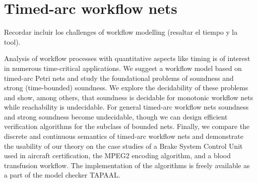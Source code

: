 \chapter{Timed-arc workflow nets}\label{chapter:c5}

Recordar incluir los challenges of workflow modelling (resaltar el tiempo y la tool).

Analysis of workflow processes with quantitative aspects
like timing is of interest in numerous time-critical applications. 
We suggest a workflow model based on timed-arc Petri nets and study
the foundational problems of soundness and strong (time-bounded) soundness.
We explore the decidability of these problems
and show, among others, that soundness is decidable for monotonic 
workflow nets while reachability is undecidable.
For general timed-arc workflow nets soundness and
strong soundness become undecidable, though we can design efficient
verification algorithms for the subclass of bounded nets. 
Finally, we compare the discrete and continuous semantics of timed-arc
workflow nets and demonstrate the usability of our theory on
the case studies of a Brake System Control Unit used in aircraft certification,
the MPEG2 encoding algorithm, and 
a blood transfusion workflow.
The implementation of the algorithms is  
freely available as a part of the model checker TAPAAL.






